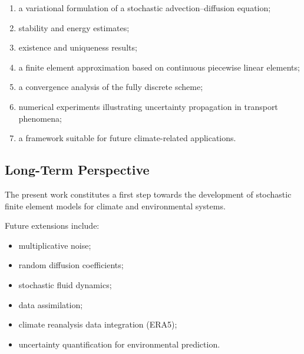 \begin{enumerate}
\item a variational formulation of a stochastic advection--diffusion equation;
\item stability and energy estimates;
\item existence and uniqueness results;
\item a finite element approximation based on continuous piecewise linear elements;
\item a convergence analysis of the fully discrete scheme;
\item numerical experiments illustrating uncertainty propagation in transport phenomena;
\item a framework suitable for future climate-related applications.
\end{enumerate}

\subsection*{Long-Term Perspective}

The present work constitutes a first step towards the development of stochastic finite element models for climate and environmental systems.

Future extensions include:

\begin{itemize}
\item multiplicative noise;
\item random diffusion coefficients;
\item stochastic fluid dynamics;
\item data assimilation;
\item climate reanalysis data integration (ERA5);
\item uncertainty quantification for environmental prediction.
\end{itemize}
